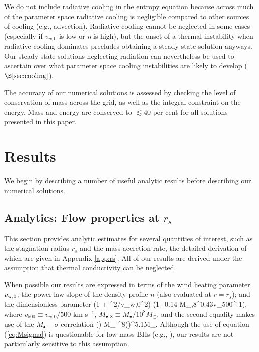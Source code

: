 \documentclass[usenatbib,fleqn]{mn2e}
\newcommand{\rs}{r_s}
\newcommand{\Mbheight}{M_{\bullet,8}}
\newcommand{\vwO}{v_{w,0}}
\begin{document}
We do not include radiative cooling in the entropy equation because
across much of the parameter space radiative cooling is negligible
compared to other sources of cooling (e.g., advection).  Radiative
cooling cannot be neglected in some cases (especially if $\vwO$ is low
or $\eta$ is high), but the onset of a thermal instability when
radiative cooling dominates precludes obtaining a steady-state
solution anyways.  Our steady state solutions neglecting radiation can
nevertheless be used to ascertain over what parameter space cooling
instabilities are likely to develop ($\S\ref{sec:cooling}$).

The accuracy of our numerical solutions is assessed by checking the
level of conservation of mass across the grid, as well as the integral
constraint on the energy.  Mass and energy are conserved to $\lesssim
40$ per cent for all solutions presented in this
paper. %


\section{Results}

We begin by describing a number of useful analytic results before describing our numerical solutions.  

\label{sec:results}
\subsection{Analytics: Flow properties at $\rs$}

This section provides analytic estimates for several quantities of interest, such as the stagnation radius $\rs$ and the mass accretion rate, the detailed derivation of which are given in Appendix \ref{app:rs}.  All of our results are derived under the assumption that thermal conductivity can be neglected.

When possible our results are expressed in terms of the wind heating
parameter $v_{\rm w,0}$; the power-law slope of the density profile
$n$ (also evaluated at $r = \rs$); and the dimensionless parameter \be
\chi \equiv \left(1 + \sigma^{2}/v_{\rm w,0}^{2}\right) \approx
\left(1+0.14 \Mbheight^{0.43}v_{500}^{-1}\right), \ee where $v_{500}
\equiv v_{w,0}/500$ km s$^{-1}$, $M_{\bullet,8} \equiv
M_{\bullet}/10^{8}M_{\odot}$, and the second equality makes use of the
$M_{\bullet}-\sigma$ correlation (\citealt{Gultekin+09}) \be
M_{\bullet} ^{8}\left(\right)^{5.1}M_{\odot}.
\label{eq:Msigma}
\ee
Although the use of equation (\ref{eq:Msigma}) is questionable for low mass BHs (e.g., \citealt{Greene&Ho07}), our results are not particularly sensitive to this assumption.  
\end{document}
